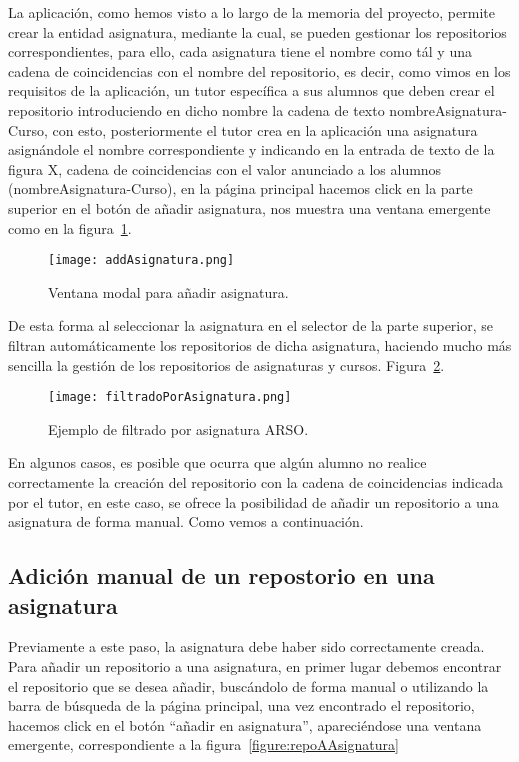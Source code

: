     La aplicación, como hemos visto a lo largo de la memoria del proyecto, permite crear la entidad asignatura, mediante la cual, se pueden gestionar los repositorios correspondientes, para ello, cada asignatura tiene el nombre como tál y una cadena de coincidencias con el nombre del repositorio, es decir, como vimos en los requisitos de la aplicación, un tutor específica a sus alumnos que deben crear el repositorio introduciendo en dicho nombre la cadena de texto nombreAsignatura-Curso, con esto, posteriormente el tutor crea en la aplicación una asignatura asignándole el nombre correspondiente y indicando en la entrada de texto de la figura X, cadena de coincidencias con el valor anunciado a los alumnos (nombreAsignatura-Curso), en la página principal hacemos click en la parte superior en el botón de añadir asignatura, nos muestra una ventana emergente como en la figura~\ref{figure:addAsignatura}.

    \begin{figure}[h!]
      \texttt{[image: addAsignatura.png]}
      \caption{Ventana modal para añadir asignatura.}
      \label{figure:addAsignatura}
    \end{figure}

    De esta forma al seleccionar la asignatura en el selector de la parte superior, se filtran automáticamente los repositorios de dicha asignatura, haciendo mucho más sencilla la gestión de los repositorios de asignaturas y cursos. Figura~\ref{figure:filtradoAsignatura}.

    \begin{figure}[h!]
      \texttt{[image: filtradoPorAsignatura.png]}
      \caption{Ejemplo de filtrado por asignatura ARSO.}
      \label{figure:filtradoAsignatura}
    \end{figure}
    En algunos casos, es posible que ocurra que algún alumno no realice correctamente la creación del repositorio con la cadena de coincidencias indicada por el tutor, en este caso, se ofrece la posibilidad de añadir un repositorio a una asignatura de forma manual. Como vemos a continuación.




\subsection{Adición manual de un repostorio en una asignatura}


    Previamente a este paso, la asignatura debe haber sido correctamente creada.
    Para añadir un repositorio a una asignatura, en primer lugar debemos encontrar el repositorio que se desea añadir, buscándolo de forma manual o utilizando la barra de búsqueda de la página principal, una vez encontrado el repositorio, hacemos click en el botón “añadir en asignatura”, apareciéndose una ventana emergente, correspondiente a la figura~\ref{figure:repoAAsignatura}

